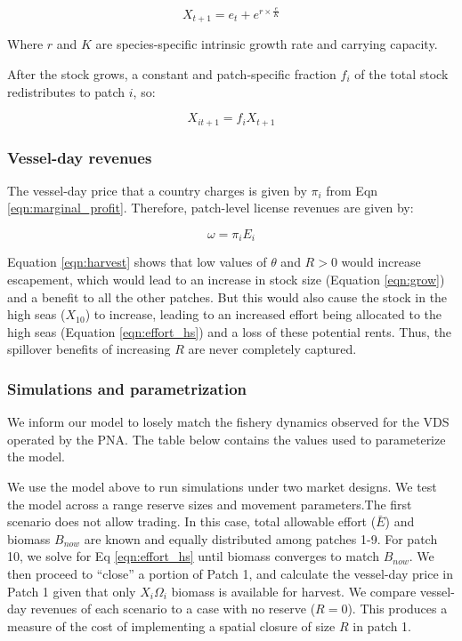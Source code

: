 \documentclass[12pt]{article}
\begin{document}
$$
X_{t+1} = e_t + e^{r \times \frac{e}{K}}
\label{eqn:grow}
$$

Where $r$ and $K$ are species-specific intrinsic growth rate and carrying capacity.

After the stock grows, a constant and patch-specific fraction $f_i$ of the total stock redistributes to patch $i$, so:

$$
X_{it+1} = f_iX_{t+1}
\label{eqn:disperse}
$$

\subsubsection{Vessel-day revenues}

The vessel-day price that a country charges is given by $\pi_i$ from Eqn \ref{eqn:marginal_profit}. Therefore, patch-level license revenues are given by:

$$
\omega = \pi_iE_i
\label{eqn:license_revenue}
$$

Equation \ref{eqn:harvest} shows that low values of $\theta$ and $R > 0$ would increase escapement, which would lead to an increase in stock size (Equation \ref{eqn:grow}) and a benefit to all the other patches. But this would also cause the stock in the high seas ($X_{10}$) to increase, leading to an increased effort being allocated to the high seas (Equation \ref{eqn:effort_hs}) and a loss of these potential rents. Thus, the spillover benefits of increasing $R$ are never completely captured.

\subsubsection{Simulations and parametrization}

We inform our model to losely match the fishery dynamics observed for the VDS operated by the PNA. The table below contains the values used to parameterize the model.



We use the model above to run simulations under two market designs. We test the model across a range reserve sizes and movement parameters.The first scenario does not allow trading. In this case, total allowable effort ($\bar{E}$) and biomass $B_{now}$ are known and equally distributed among patches 1-9. For patch 10, we solve for Eq \ref{eqn:effort_hs} until biomass converges to match $B_{now}$. We then proceed to ``close'' a portion of Patch 1, and calculate the vessel-day price in Patch 1 given that only $X_i\Omega_i$ biomass is available for harvest. We compare vessel-day revenues of each scenario to a case with no reserve ($R = 0$). This produces a measure of the cost of implementing a spatial closure of size $R$ in patch 1.
\end{document}
